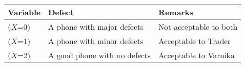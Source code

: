 \begin{tabular}{|l|l|l|}
\hline
\textbf{Variable}&\textbf{Defect}&\textbf{Remarks} \\ 
\hline
($X$=0)& A phone with major defects &Not acceptable to both\\ \hline
($X$=1)& A phone with minor defects  &Acceptable to Trader\\ \hline
($X$=2)& A good phone with no defects &Acceptable to Varnika\\ \hline
\end{tabular}\\\\


